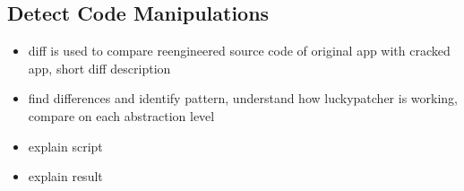 \subsection{Detect Code Manipulations} \label{subsection:forensics-tools-diff}
\begin{itemize}
  \item diff is used to compare reengineered source code of original app with cracked app, short diff description
  \item find differences and identify pattern, understand how luckypatcher is working, compare on each abstraction level
  \item explain script
  \item explain result
\end{itemize}
